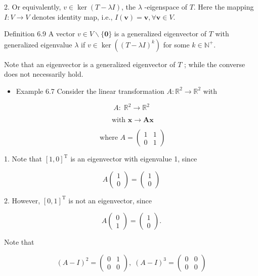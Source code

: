 \documentclass[11pt]{article}
\begin{document}
2. Or equivalently, \(v \in  \ker \left( {T - {\lambda I}}\right)\), the \(\lambda\) -eigenspace of \(T\). Here the mapping \(I : V \rightarrow  V\) denotes identity map, i.e., \(I\left( \mathbf{v}\right)  = \mathbf{v},\forall \mathbf{v} \in  V\).

Definition 6.9 A vector \(v \in  V \smallsetminus  \{ \mathbf{0}\}\) is a generalized eigenvector of \(T\) with generalized eigenvalue \(\lambda\) if \(v \in  \ker \left( {\left( T - \lambda I\right) }^{k}\right)\) for some \(k \in  {\mathbb{N}}^{ + }\).

Note that an eigenvector is a generalized eigenvector of \(T\) ; while the converse does not necessarily hold.

\begin{itemize}
\item Example 6.7 Consider the linear transformation \(A : {\mathbb{R}}^2 \rightarrow  {\mathbb{R}}^2\) with
\end{itemize}

\[
A : \;{\mathbb{R}}^2 \rightarrow  {\mathbb{R}}^2
\]

\[
\text{ with }\mathbf{x} \rightarrow  \mathbf{{Ax}}
\]

\[
\text{ where }A = \left( \begin{array}{ll} 1 & 1 \\  0 & 1 \end{array}\right)
\]

1. Note that \({\left\lbrack  1,0\right\rbrack  }^{\mathrm{T}}\) is an eigenvector with eigenvalue 1, since

\[
A\left( \begin{array}{l} 1 \\  0 \end{array}\right)  = \left( \begin{array}{l} 1 \\  0 \end{array}\right)
\]

2. However, \({\left\lbrack  0,1\right\rbrack  }^{\mathrm{T}}\) is not an eigenvector, since

\[
A\left( \begin{array}{l} 0 \\  1 \end{array}\right)  = \left( \begin{array}{l} 1 \\  0 \end{array}\right) .
\]

Note that

\[
{\left( A - I\right) }^2 = \left( \begin{array}{ll} 0 & 1 \\  0 & 0 \end{array}\right) ,\;{\left( A - I\right) }^{3} = \left( \begin{array}{ll} 0 & 0 \\  0 & 0 \end{array}\right)
\]
\end{document}
